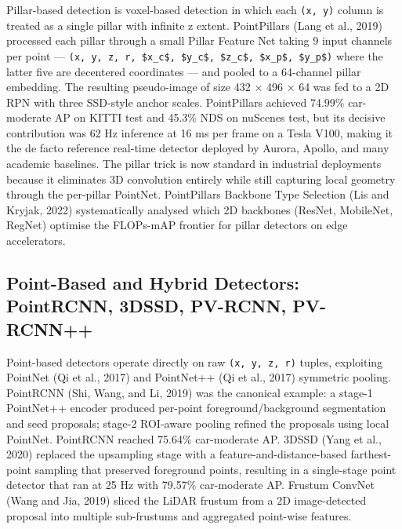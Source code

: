 Pillar-based detection is voxel-based detection in which each \texttt{(x,\ y)} column is treated as a single pillar with infinite z extent. PointPillars (Lang et al., 2019) processed each pillar through a small Pillar Feature Net taking 9 input channels per point --- \texttt{(x,\ y,\ z,\ r,\ \$x\_c\$,\ \$y\_c\$,\ \$z\_c\$,\ \$x\_p\$,\ \$y\_p\$)} where the latter five are decentered coordinates --- and pooled to a 64-channel pillar embedding. The resulting pseudo-image of size 432 × 496 × 64 was fed to a 2D RPN with three SSD-style anchor scales. PointPillars achieved 74.99\% car-moderate AP on KITTI test and 45.3\% NDS on nuScenes test, but its decisive contribution was 62 Hz inference at 16 ms per frame on a Tesla V100, making it the de facto reference real-time detector deployed by Aurora, Apollo, and many academic baselines. The pillar trick is now standard in industrial deployments because it eliminates 3D convolution entirely while still capturing local geometry through the per-pillar PointNet. PointPillars Backbone Type Selection (Lis and Kryjak, 2022) systematically analysed which 2D backbones (ResNet, MobileNet, RegNet) optimise the FLOPs-mAP frontier for pillar detectors on edge accelerators.

\subsection{Point-Based and Hybrid Detectors: PointRCNN, 3DSSD, PV-RCNN, PV-RCNN++}\label{point-based-and-hybrid-detectors-pointrcnn-3dssd-pv-rcnn-pv-rcnn}

Point-based detectors operate directly on raw \texttt{(x,\ y,\ z,\ r)} tuples, exploiting PointNet (Qi et al., 2017) and PointNet++ (Qi et al., 2017) symmetric pooling. PointRCNN (Shi, Wang, and Li, 2019) was the canonical example: a stage-1 PointNet++ encoder produced per-point foreground/background segmentation and seed proposals; stage-2 ROI-aware pooling refined the proposals using local PointNet. PointRCNN reached 75.64\% car-moderate AP. 3DSSD (Yang et al., 2020) replaced the upsampling stage with a feature-and-distance-based farthest-point sampling that preserved foreground points, resulting in a single-stage point detector that ran at 25 Hz with 79.57\% car-moderate AP. Frustum ConvNet (Wang and Jia, 2019) sliced the LiDAR frustum from a 2D image-detected proposal into multiple sub-frustums and aggregated point-wise features.

